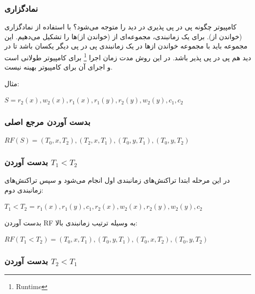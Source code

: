 \documentclass[a4paper]{article}
\begin{document}
\newpage

\subsubsection{نمادگزاری}

کامپیوتر چگونه پی در پی پذیری در دید را متوجه می‌شود؟ با استفاده از نمادگزاری
(خواندن از). برای یک زمانبندی، مجموعه‌ای از (خواندن از‌)ها را تشکیل می‌دهیم. این
مجموعه باید با مجموعه خواندن از‌ها در یک زمانبندی پی در پی دیگر یکسان باشد تا در
دید هم پی در پی پذیر باشد. در این روش مدت زمان اجرا \footnote{Runtime} برای
کامپیوتر طولانی است و اجرای آن برای کامپیوتر بهینه نیست.

مثال:

\begin{LTR}
$S = r_{2}(x), w_{2}(x), r_{1}(x), r_{1}(y), r_{2}(y), w_{2}(y), c_{1}, c_{2} $
\end{LTR}

\subsubsection*{بدست آوردن مرجع اصلی}

\begin{LTR}
$RF(S) = (T_{0}, x, T_{2}), (T_{2}, x, T_{1}), (T_{0}, y, T_{1}), (T_{0}, y, T_{2})$
\end{LTR}

\subsubsection*{بدست آوردن $T_{1} < T_{2}$}

در این مرحله ابتدا تراکنش‌های زمانبندی اول انجام می‌شود و سپس تراکنش‌های زمانبندی دوم:

\begin{LTR}
$T_{1} < T_{2}$ = $r_{1}(x), r_{1}(y), c_{1}, r_{2}(x), w_{2}(x), r_{2}(y), w_{2}(y), c_{2}$
\end{LTR}

بدست آوردن RF به وسیله ترتیب زمانبندی بالا:

\begin{LTR}
$RF(T_{1} < T_{2}) = (T_{0}, x, T_{1}), (T_{0}, y, T_{1}), (T_{0}, x, T_{2}), (T_{0}, y, T_{2})$
\end{LTR}

\subsubsection*{بدست آوردن $T_{2} < T_{1}$}
\end{document}
